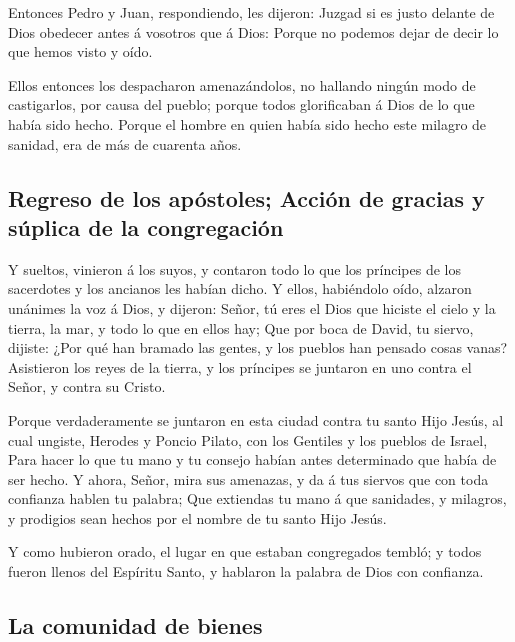  Entonces Pedro y Juan, respondiendo, les dijeron: Juzgad
si es justo delante de Dios obedecer antes á vosotros que á Dios:
 Porque no podemos dejar de decir lo que hemos visto y
oído.

 Ellos entonces los despacharon amenazándolos, no
hallando ningún modo de castigarlos, por causa del pueblo; porque todos
glorificaban á Dios de lo que había sido hecho.  Porque
el hombre en quien había sido hecho este milagro de sanidad, era de más
de cuarenta años.

\hypertarget{regreso-de-los-apuxf3stoles-acciuxf3n-de-gracias-y-suxfaplica-de-la-congregaciuxf3n}{%
\subsection{Regreso de los apóstoles; Acción de gracias y súplica de la
congregación}\label{regreso-de-los-apuxf3stoles-acciuxf3n-de-gracias-y-suxfaplica-de-la-congregaciuxf3n}}

 Y sueltos, vinieron á los suyos, y contaron todo lo que
los príncipes de los sacerdotes y los ancianos les habían dicho.
 Y ellos, habiéndolo oído, alzaron unánimes la voz á
Dios, y dijeron: Señor, tú eres el Dios que hiciste el cielo y la
tierra, la mar, y todo lo que en ellos hay;  Que por boca
de David, tu siervo, dijiste: ¿Por qué han bramado las gentes, y los
pueblos han pensado cosas vanas?  Asistieron los reyes de
la tierra, y los príncipes se juntaron en uno contra el Señor, y contra
su Cristo.

 Porque verdaderamente se juntaron en esta ciudad contra
tu santo Hijo Jesús, al cual ungiste, Herodes y Poncio Pilato, con los
Gentiles y los pueblos de Israel,  Para hacer lo que tu
mano y tu consejo habían antes determinado que había de ser hecho.
 Y ahora, Señor, mira sus amenazas, y da á tus siervos
que con toda confianza hablen tu palabra;  Que extiendas
tu mano á que sanidades, y milagros, y prodigios sean hechos por el
nombre de tu santo Hijo Jesús.

 Y como hubieron orado, el lugar en que estaban
congregados tembló; y todos fueron llenos del Espíritu Santo, y hablaron
la palabra de Dios con confianza.

\hypertarget{la-comunidad-de-bienes}{%
\subsection{La comunidad de bienes}\label{la-comunidad-de-bienes}}

